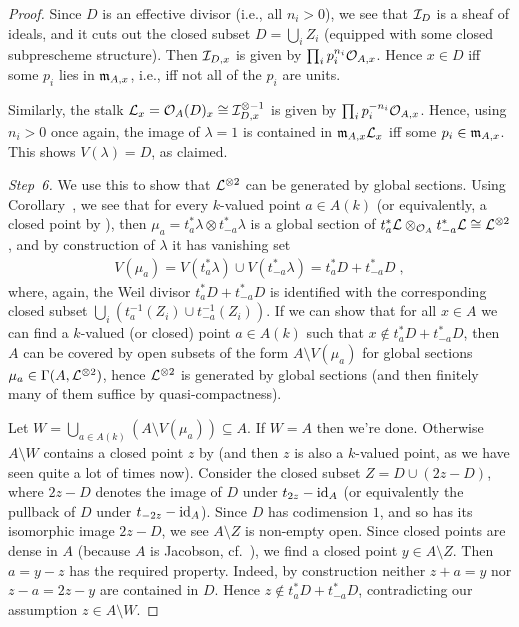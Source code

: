 \documentclass[a4paper,parskip=half,numbers=enddot, DIV=12]{scrreprt}
\begin{document}
\begin{proof}
	Since $D$ is an effective divisor (i.e., all $n_i>0$), we see that $\mathcal{I}_D$ is a sheaf of ideals, and it cuts out the closed subset $D=\bigcup_iZ_i$ (equipped with some closed subprescheme structure). Then $\mathcal{I}_{D,x}$ is given by $\prod_ip_i^{n_i}\mathcal{O}_{A,x}$. Hence $x\in D$ iff some $p_i$ lies in $\mathfrak{m}_{A,x}$, i.e., iff not all of the $p_i$ are units.
	
	Similarly, the stalk $\mathcal{L}_x=\mathcal{O}_A(D)_x\cong \mathcal{I}_{D,x}^{\otimes -1}$ is given by $\prod_ip_i^{-n_i}\mathcal{O}_{A,x}$. Hence, using $n_i>0$ once again, the image of $\lambda=1$ is contained in $\mathfrak{m}_{A,x}\mathcal{L}_x$ iff some $p_i\in \mathfrak{m}_{A,x}$. This shows $V(\lambda)=D$, as claimed.
	
	\emph{Step~6.} We use this to show that $\mathcal{L}^{\otimes 2}$ can be generated by global sections. Using Corollary~, we see that for every $k$-valued point $a\in A(k)$ (or equivalently, a closed point by ), then $\mu_a=t_a^*\lambda\otimes t_{-a}^*\lambda$ is a global section of $t_a^*\mathcal{L}\otimes_{\mathcal{O}_A}t_{-a}^*\mathcal{L}\cong \mathcal{L}^{\otimes 2}$, and by construction of $\lambda$ it has vanishing set 
	\begin{align*}
		V(\mu_a)=V(t_a^*\lambda)\cup V(t_{-a}^*\lambda)=t_a^*D+t_{-a}^*D\;,
	\end{align*}
	where, again, the Weil divisor $t_a^*D+t_{-a}^*D$ is identified with the corresponding closed subset $\bigcup_i(t_{a}^{-1}(Z_i)\cup t_{-a}^{-1}(Z_i))$. If we can show that for all $x\in A$ we can find a $k$-valued (or closed) point $a\in A(k)$ such that $x\notin t_a^*D+t_{-a}^*D$, then $A$ can be covered by open subsets of the form $A\setminus V(\mu_a)$ for global sections $\mu_a\in\Gamma(A,\mathcal{L}^{\otimes 2})$, hence $\mathcal{L}^{\otimes 2}$ is generated by global sections (and then finitely many of them suffice by quasi-compactness).
	
	Let $W=\bigcup_{a\in A(k)}(A\setminus V(\mu_a))\subseteq A$. If $W=A$ then we're done. Otherwise $A\setminus W$ contains a closed point $z$ by \cite[Proposition~2.1.1]{alggeo1} (and then $z$ is also a $k$-valued point, as we have seen quite a lot of times now). Consider the closed subset $Z=D\cup (2z-D)$, where $2z-D$ denotes the image of $D$ under $t_{2z}-\operatorname{id}_A$ (or equivalently the pullback of $D$ under $t_{-2z}-\operatorname{id}_A$). Since $D$ has codimension $1$, and so has its isomorphic image $2z-D$, we see $A\setminus Z$ is non-empty open. Since closed points are dense in $A$ (because $A$ is Jacobson, cf.\ \cite[Definition~2.4.2]{alggeo1}), we find a closed point $y\in A\setminus Z$. Then $a=y-z$ has the required property. Indeed, by construction neither $z+a=y$ nor $z-a=2z-y$ are contained in $D$. Hence $z\notin t_a^*D+t_{-a}^*D$, contradicting our assumption $z\in A\setminus W$.
	

\end{proof}
\end{document}
